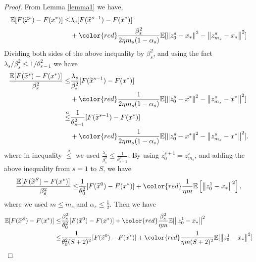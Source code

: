 \documentclass[10pt, conference, compsocconf]{IEEEtran}
\newcommand*{\E}{\mathbb{E}}
\newcommand{\norm}[1]{\left\lVert#1\right\rVert}
\theoremstyle{definition}
\theoremstyle{remark}
\begin{document}
\begin{proof}
From Lemma \ref{lemma1} we have,
\begin{equation}
\begin{split}
\E[F(\widetilde{x}^s)-F(x^*)]\leq & \lambda_s[F({\widetilde x}^{s-1})-F(x^*)]\\ 
&+ {\color{red}\frac{\beta_s^2}{2\eta m_s(1-\alpha_s)}}\E[\norm{z_{0}^s-x_*}^2-\norm{z_{m_s}^s-x_*}^2]
\end{split}
\end{equation}
Dividing both sides of the above inequality by $\beta_s^2$, and using the fact $\lambda_s/\beta_s^2 \leq 1/\theta_{s-1}^2$ we have
\begin{equation*}
\begin{split}
\frac{\E[F(\widetilde{x}^s)-F(x^*)]}{\beta_s^2}\leq & \frac{\lambda_s}{\beta_s^2}[F(\widetilde{x}^{s-1})-F(x^*)]\\ 
& + {\color{red}\frac{1 }{2\eta m_s(1-\alpha_s)}}\E[\norm{z_{0}^s-x^*}^2-\norm{z_{m_s}^s-x^*}^2]\\
\stackrel{a}{\leq} & \frac{1}{\theta_{s-1}^2}[F(\widetilde{x}^{s-1})-F(x^*)] \\
&+ {\color{red}\frac{1}{2\eta m_s(1-\alpha_s)}}\E[\norm{z_{0}^s-x^*}^2-\norm{z_{m_s}^s-x^*}^2]. 
\end{split}
\end{equation*}
where in inequality $\stackrel{a}{\leq}$ we used $\frac{\lambda_s}{\beta_s^2}\leq \frac{1}{\theta_{s-1}^2}$. By using $z_0^{s+1} = z_{m_s}^s$, and adding the above inequality from $s=1$ to $S$, we have
\begin{equation}
\begin{split}
\frac{\E[F(\widetilde{x}^S)-F(x^*)]}{\beta_s^2}\leq & \frac{1}{\theta_{0}^2}[F(\widetilde{x}^{0})-F(x^*)] + {\color{red}\frac{1}{\eta m}}\E\left[\norm{z_{0}^1-x_*}^2\right], \\
\end{split}
\end{equation}
where we used $m\leq m_s$ and $\alpha_s\leq \frac{1}{2}$.
Then we have
\begin{equation}
\begin{split}
{\E[F(\widetilde{x}^S)-F(x^*)]}\leq & \frac{\beta_s^2}{\theta_{0}^2}[F(\widetilde{x}^{0})-F(x^*)]+ {\color{red}\frac{ \beta_s^2}{\eta m}}\E[\norm{z_{0}^1-x_*}^2\\
\leq & \frac{1}{\theta_{0}^2(S+2)^2}[F(\widetilde{x}^{0})-F(x^*)] + {\color{red}\frac{1 }{\eta m(S+2)^2}}\E[\norm{z_{0}^1-x_*}^2]
\end{split}
\end{equation}


\end{proof}
\end{document}
